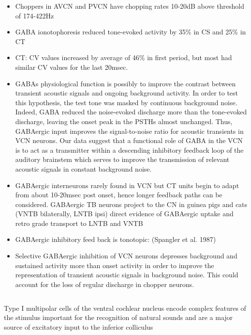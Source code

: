 \documentclass[10pt,a4paper]{article}
\begin{document}
\begin{itemize}
\item Choppers in AVCN and PVCN have chopping rates 10-20dB above threshold of
  174-422Hz
\item GABA ionotophoresis reduced tone-evoked activity by 35\% in CS and 25\% in
  CT
\item CT: CV values increased by average of 46\% in first period, but most had
  similar CV values for the last 20msec.
\item {GABA}s physiological
  function is possibly to improve the contrast between transient acoustic
  signals and ongoing background activity. In order to test this hypothesis, the
  test tone was masked by continuous background noise. Indeed,
  {GABA} reduced the noise-evoked discharge more
  than the tone-evoked discharge, leaving the onset peak in the PSTHs almost
  unchanged. Thus, {GABA}ergic input improves the
  signal-to-noise ratio for acoustic transients in VCN neurons. Our data suggest
  that a functional role of {GABA} in the VCN is to
  act as a transmitter within a descending inhibitory feedback loop of the
  auditory brainstem which serves to improve the transmission of relevant
  acoustic signals in constant background noise.
\item GABAergic interneurons rarely found in VCN
  \citep{AdamsMugnaini:1987,Moore:1987} but CT units begin to adapt from about
  10-20msec post onset, hence longer feedback paths can be considered.
  GABAergic TB neurons project to the CN in guinea pigs and cats (VNTB
  bilaterally, LNTB ipsi) \citep{Adams:1983a,ShoreHelfertEtAl:1991,SpanglerCantEtAl:1987,WinterRobertsonEtAl:1989} direct evidence of GABAergic uptake and retro
  grade transport to LNTB and VNTB \citep{OstapoffMorestEtAl:1990}
\item GABAergic inhibitory feed back is tonotopic: (Spangler et al.  1987)
\item Selective GABAergic inhibition of VCN neurons depresses background and
  sustained activity more than onset activity in order to improve the
  representation of transient acoustic signals in background noise.  This could
  account for the loss of regular discharge in chopper neurons.
\end{itemize}

\subsection{\citep{CantBenson:2003}}
 Type I multipolar cells of the ventral cochlear nucleus
encode complex features of the stimulus important for the recognition of natural
sounds and are a major source of excitatory input to the inferior colliculus
\end{document}
